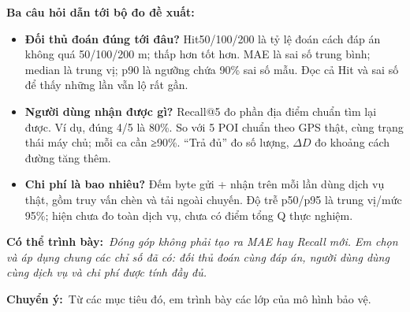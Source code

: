 \documentclass[10pt,a4paper]{article}
\newcommand{\say}[1]{\par\textbf{Có thể trình bày:}\ \textit{#1}\par}
\newcommand{\transition}[1]{\par\textbf{Chuyển ý:}\ #1\par}
\begin{document}
\textbf{Ba câu hỏi dẫn tới bộ đo đề xuất:}
\begin{itemize}
\item \textbf{Đối thủ đoán đúng tới đâu?} Hit50/100/200 là tỷ lệ đoán cách đáp án không quá 50/100/200 m; thấp hơn tốt hơn. MAE là sai số trung bình; median là trung vị; p90 là ngưỡng chứa 90\% sai số mẫu. Đọc cả Hit và sai số để thấy những lần vẫn lộ rất gần.
\item \textbf{Người dùng nhận được gì?} Recall@5 đo phần địa điểm chuẩn tìm lại được. Ví dụ, đúng 4/5 là 80\%. So với 5 POI chuẩn theo GPS thật, cùng trạng thái máy chủ; mỗi ca cần ≥90\%. “Trả đủ” đo số lượng, $\Delta D$ đo khoảng cách đường tăng thêm.
\item \textbf{Chi phí là bao nhiêu?} Đếm byte gửi + nhận trên mỗi lần dùng dịch vụ thật, gồm truy vấn chèn và tải ngoài chuyến. Độ trễ p50/p95 là trung vị/mức 95\%; hiện chưa đo toàn dịch vụ, chưa có điểm tổng Q thực nghiệm.
\end{itemize}
\say{Đóng góp không phải tạo ra MAE hay Recall mới. Em chọn và áp dụng chung các chỉ số đã có: đối thủ đoán cùng đáp án, người dùng dùng cùng dịch vụ và chi phí được tính đầy đủ.}
\transition{Từ các mục tiêu đó, em trình bày các lớp của mô hình bảo vệ.}
\end{document}

